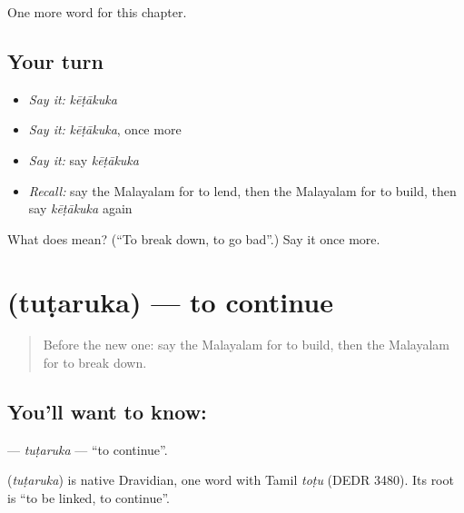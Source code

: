 \begin{grammarlens}[title={What you've built}]
One more word for this chapter.
\end{grammarlens}

\subsection*{Your turn}
\begin{itemize}
\raggedright
  \item \emph{Say it:} \emph{kēṭākuka}
  \item \emph{Say it:} \emph{kēṭākuka}, once more
  \item \emph{Say it:} say \emph{kēṭākuka}
  \item \emph{Recall:} say the Malayalam for to lend, then the Malayalam for to build, then say \emph{kēṭākuka} again
\end{itemize}

\begin{tcolorbox}[breakable,colback=teal!4,colframe=teal!35!black,title={Before you move on}]
What does  mean? (\textquotedblleft{}To break down, to go bad\textquotedblright{}.) Say it once more.
\end{tcolorbox}
\section[\texorpdfstring{\ml{തുടരുക} (tuṭaruka)}{തുടരുക (tuṭaruka)}]{ (tuṭaruka) — to continue}

\label{lesson:ML-C271-tutaruka}



\begin{quote}
Before the new one: say the Malayalam for to build, then the Malayalam for to break down.
\end{quote}

\subsection*{You'll want to know: }
\textbf{} — \emph{tuṭaruka} — \textquotedblleft{}to continue\textquotedblright{}.

\begin{cousinweb}
\textbf{} (\emph{tuṭaruka}) is native Dravidian, one word with Tamil \emph{toṭu} (DEDR 3480). Its root is \textquotedblleft{}to be linked, to continue\textquotedblright{}.
\end{cousinweb}

